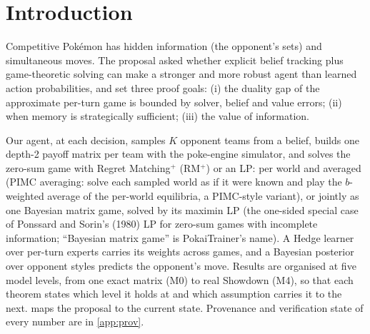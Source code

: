 \documentclass[10pt]{article}
\theoremstyle{plain}
\theoremstyle{definition}
\theoremstyle{remark}
\begin{document}
\section{Introduction}\label{sec:intro}

Competitive Pok\'emon has hidden information (the opponent's sets) and simultaneous moves. The proposal asked whether
explicit belief tracking plus game-theoretic solving can make a stronger and more robust agent than learned action
probabilities, and set three proof goals: (i) the duality gap of the approximate per-turn game is bounded by solver,
belief and value errors; (ii) when memory is strategically sufficient; (iii) the value of information.

Our agent, at each decision, samples $K$ opponent teams from a belief, builds one depth-2 payoff matrix per team with
the poke-engine simulator, and solves the zero-sum game with Regret Matching$^+$ (RM$^+$) or an LP: per world and
averaged (PIMC averaging: solve each sampled world as if it were known and play the $b$-weighted average of the per-world equilibria, a PIMC-style variant), or jointly as one Bayesian matrix game, solved by its maximin LP (the one-sided special case of Ponssard and Sorin's (1980) LP for zero-sum games with incomplete information; ``Bayesian matrix game'' is PokaiTrainer's name). A Hedge learner over per-turn experts carries its weights across games,
and a Bayesian posterior over opponent styles predicts the opponent's move. Results are organised at five model
levels, from one exact matrix (M0) to real Showdown (M4), so that each theorem states which level it holds at and
which assumption carries it to the next.  maps the proposal to the current state. Provenance and
verification state of every number are in \cref{app:prov}.
\end{document}
